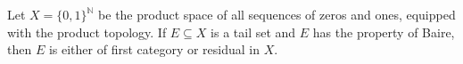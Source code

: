 Let $X = \{0,1\}^{\mathbb{N}}$ be the product space of all sequences of zeros and ones, equipped with the product topology. If $E \subseteq X$ is a tail set and $E$ has the property of Baire, then $E$ is either of first category or residual in $X$.
